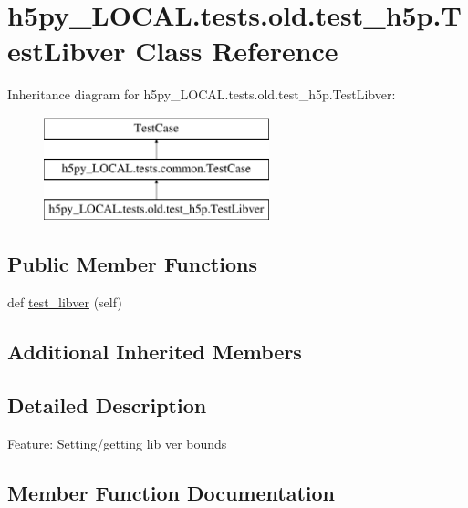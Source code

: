 \hypertarget{classh5py__LOCAL_1_1tests_1_1old_1_1test__h5p_1_1TestLibver}{}\section{h5py\+\_\+\+L\+O\+C\+A\+L.\+tests.\+old.\+test\+\_\+h5p.\+Test\+Libver Class Reference}
\label{classh5py__LOCAL_1_1tests_1_1old_1_1test__h5p_1_1TestLibver}
Inheritance diagram for h5py\+\_\+\+L\+O\+C\+A\+L.\+tests.\+old.\+test\+\_\+h5p.\+Test\+Libver\+:\begin{figure}[H]
\begin{center}
\leavevmode
\includegraphics[height=3.000000cm]{classh5py__LOCAL_1_1tests_1_1old_1_1test__h5p_1_1TestLibver}
\end{center}
\end{figure}
\subsection*{Public Member Functions}
\begin{DoxyCompactItemize}
\item 
def \hyperlink{classh5py__LOCAL_1_1tests_1_1old_1_1test__h5p_1_1TestLibver_a00d33105f1a3d371c75853690e2a90d0}{test\+\_\+libver} (self)
\end{DoxyCompactItemize}
\subsection*{Additional Inherited Members}


\subsection{Detailed Description}
\begin{DoxyVerb}    Feature: Setting/getting lib ver bounds
\end{DoxyVerb}
 

\subsection{Member Function Documentation}
\mbox{\label{classh5py__LOCAL_1_1tests_1_1old_1_1test__h5p_1_1TestLibver_a00d33105f1a3d371c75853690e2a90d0}} 
